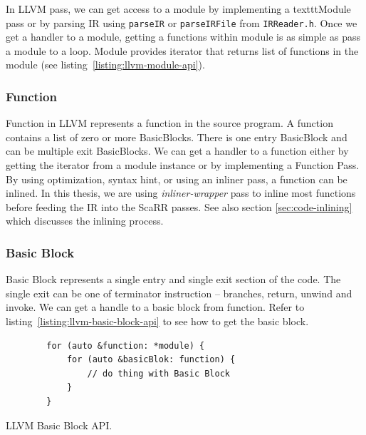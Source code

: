 In LLVM pass, we can get access to a module by implementing a texttt{Module}
pass or by parsing IR using \texttt{parseIR} or \texttt{parseIRFile} from
\texttt{IRReader.h}. Once we get a handler to a module, getting a functions
within module is as simple as pass a module to a loop.  Module provides iterator
that returns list of functions in the module (see
listing~\ref{listing:llvm-module-api}).


\subsubsection{Function}

Function in LLVM represents a function in the source program. A function
contains a list of zero or more BasicBlocks. There is one entry BasicBlock and
can be multiple exit BasicBlocks. We can get a handler to a function either by
getting the iterator from a module instance or by implementing a Function Pass.
By using optimization, syntax hint, or using an inliner pass, a function can be
inlined. In this thesis, we are using \emph{inliner-wrapper} pass to inline most
functions before feeding the IR into the ScaRR passes. See also section
\ref{sec:code-inlining} which discusses the inlining process.

\subsubsection{Basic Block}

Basic Block represents a single entry and single exit section of the code. The
single exit can be one of terminator instruction -- branches, return, unwind and
invoke. We can get a handle to a basic block from function. Refer to
listing~\ref{listing:llvm-basic-block-api} to see how to get the basic block.

\begin{listing}[htbp]
    \begin{verbatim}
        for (auto &function: *module) {
            for (auto &basicBlok: function) {
                // do thing with Basic Block
            }
        }
    \end{verbatim}
    \caption{LLVM Basic Block API.}    
    \label{listing:llvm-basic-block-api}
\end{listing}

